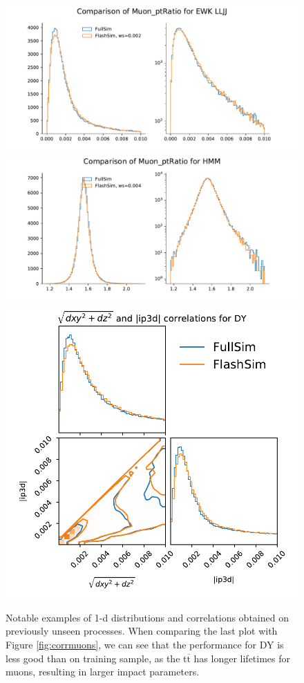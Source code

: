 \begin{figure}
    \myfloatalign
    \includegraphics[width=\linewidth]{gfx/ch5/ewkeval7.pdf} \\
    \includegraphics[width=\linewidth]{gfx/ch5/hmmeval2.pdf} \\
    \includegraphics[width=0.8\linewidth]{gfx/ch5/dycorrs.pdf} 
    \caption[1-d distributions and correlations for new processes]{Notable examples of 1-d distributions and correlations obtained on previously unseen processes. When comparing the last plot with Figure \ref{fig:corrmuons}, we can see that the performance for DY is less good than on training sample, as the t$\overline{\text{t}}$ has longer lifetimes for muons, resulting in larger impact parameters.}\label{fig:newsdists}
    
\end{figure}

